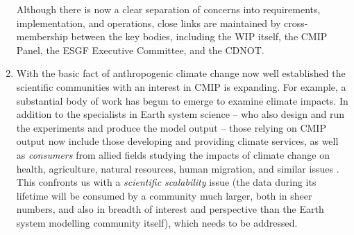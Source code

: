 \documentclass[gmd,manuscript]{copernicus}
\begin{document}
\begin{enumerate}
  Although there is now a clear separation of concerns into
  requirements, implementation, and operations, close links are
  maintained by cross-membership between the key bodies, including the
  WIP itself, the CMIP Panel, the ESGF Executive Committee, and the
  CDNOT.
\item\label{broad} With the basic fact of anthropogenic climate change
  now well established \citep[see, e.g.,][]{ref:stockeretal2013} the
  scientific communities with an interest in CMIP is expanding. For
  example, a substantial body of work has begun to emerge to examine
  climate impacts. In addition to the specialists in Earth system
  science -- who also design and run the experiments and produce the
  model output -- those relying on CMIP output now include those
  developing and providing climate services, as well as
  \emph{consumers} from allied fields studying the impacts of climate
  change on health, agriculture, natural resources, human migration,
  and similar issues \citep{ref:mossetal2010}. This confronts us with
  a \emph{scientific scalability} issue (the data during its lifetime
  will be consumed by a community much larger, both in sheer numbers,
  and also in breadth of interest and perspective than the Earth
  system modelling community itself), which needs to be addressed.


\end{enumerate}
\end{document}
